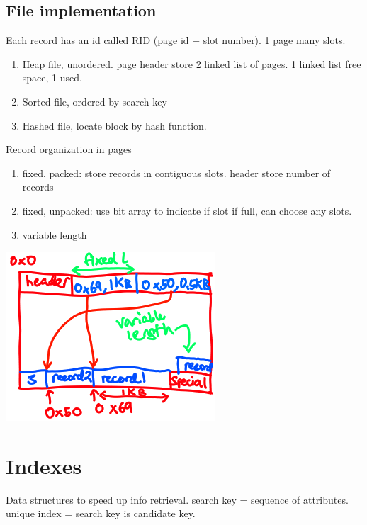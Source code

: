 \documentclass{article}
\begin{document}
\begin{multicols*}{4}
\subsection{File implementation}
Each record has an id called RID (page id + slot number). 1 page many slots.
\begin{enumerate}
  \item Heap file, unordered. page header store 2 linked list of pages. 1 linked list free space, 1 used.
  \item Sorted file, ordered by search key
  \item Hashed file, locate block by hash function.
\end{enumerate}
Record organization in pages
\begin{enumerate}
  \item fixed, packed: store records in contiguous slots. header store number of records
  \item fixed, unpacked: use bit array to indicate if slot if full, can choose any slots.
  \item variable length
\end{enumerate}
\includegraphics[width=\linewidth]{./res/pgSlottedPage.png}

\section{Indexes}
Data structures to speed up info retrieval. search key = sequence of attributes. unique index = search key is candidate key.


\end{multicols*}
\end{document}
